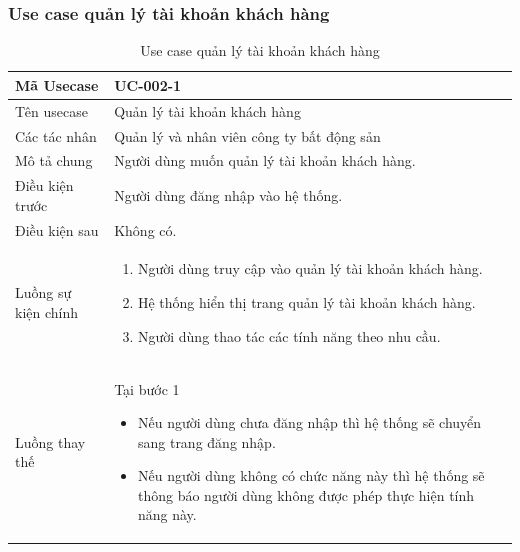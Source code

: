 \documentclass[12pt,a4paper]{article}
\begin{document}
    \subsubsection*{Use case quản lý tài khoản khách hàng}
    \begin{table}[H]
        \centering
        \begin{tabular}{|p{3.5cm}|p{11.5cm}|c|}
            \hline
            Mã Usecase      & UC-002-1                                      \\
            \hline
            Tên usecase     & Quản lý tài khoản khách hàng                  \\
            \hline
            Các tác nhân    & Quản lý và nhân viên công ty bất động sản     \\
            \hline
            Mô tả chung     & Người dùng muốn quản lý tài khoản khách hàng. \\
            \hline
            Điều kiện trước & Người dùng đăng nhập vào hệ thống.            \\
            \hline
            Điều kiện sau   & Không có.                                     \\
            \hline
            Luồng sự kiện chính & \vspace{-.8cm}\begin{enumerate}
                                                    \item Người dùng truy cập vào quản lý tài khoản khách hàng.
                                                    \item Hệ thống hiển thị trang quản lý tài khoản khách hàng.
                                                    \item Người dùng thao tác các tính năng theo nhu cầu.
            \end{enumerate}
            \\
            \hline
            Luồng thay thế & Tại bước 1\newline
            \vspace{-.8cm}\begin{itemize}
                              \item Nếu người dùng chưa đăng nhập thì hệ thống sẽ chuyển sang trang đăng nhập.
                              \item Nếu người dùng không có chức năng này thì hệ thống sẽ thông báo người dùng không được phép thực hiện tính năng này.
            \end{itemize}

            \\ \hline
        \end{tabular}
        \caption{Use case quản lý tài khoản khách hàng}
    \end{table}
\end{document}

